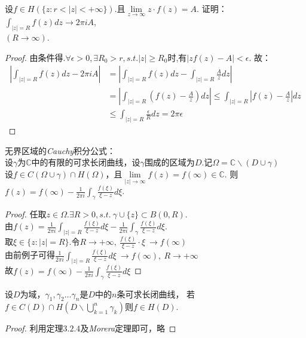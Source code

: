 \begin{eg}
	设$f\in H(\{z:r<|z|<+\infty\})$.且$\lim\limits_{z\rightarrow\infty}z\cdot f(z)=A$.
	证明：$\displaystyle{\int_{|z|=R}f(z)dz\rightarrow 2\pi iA}$,\\$(R\rightarrow\infty)$.
\end{eg}
\begin{proof}
	由条件得.$\forall\epsilon>0,\exists R_0>r,s.t.|z|\geq R_0$时,有$|zf(z)-A|<\epsilon$.
	故：
	\begin{align*}
	\left|\int_{|z|=R}f(z)dz-2\pi iA\right|
	&=\left|\int_{|z|=R}f(z)dz-\int_{|z|=R}\frac{A}{z}dz\right|\\
	&=\left|\int_{|z|=R}(f(z)-\frac{A}{z})dz\right|\leq\int_{|z|=R}\left|f(z)-\frac{A}{z}\right|dz\\
	&\leq\int_{|z|=R}\frac{\epsilon}{R}dz=2\pi\epsilon
	\end{align*}
\end{proof}
\begin{eg}
	无界区域的\emph{Cauchy}积分公式：\\
	设$\gamma$为$\mathbb{C}$中的有限的可求长闭曲线，设$\gamma$围成的区域为$D$.记$\Omega=\mathbb{C}\backslash(D\cup \gamma)$\\
	设$f\in C(\Omega\cup \gamma)\cap H(\Omega)$，且$\lim\limits_{|z|\rightarrow\infty}f(z)=f(\infty)\in\mathbb{C}$.
	则$\displaystyle{f(z)=f(\infty)-\frac{1}{2\pi i}\int_{\gamma}\frac{f(\xi)}{\xi-z}d\xi}$.
\end{eg}
\begin{proof}
	任取$\displaystyle{z\in\Omega.\exists R>0,s.t.\ \gamma\cup\{z\}\subset B(0,R)}$.\\
	由$\displaystyle{f(z)=\frac{1}{2\pi i}\int_{|z|=R}\frac{f(\xi)}{\xi-z}d\xi-\frac{1}{2\pi i}\int_{\gamma}\frac{f(\xi)}{\xi-z}d\xi}$.\\
	取$\displaystyle{\xi\in\{z:|z|=R\}}$.令$\displaystyle{R\rightarrow+\infty,\ \frac{f(\xi)}{\xi-z}\cdot\xi\ \rightarrow f(\infty)}$\\
	由前例子可得$\displaystyle{\frac{1}{2\pi i}\int_{|z|=R}\frac{f(\xi)}{\xi-z}d\xi\ \rightarrow f(\infty),\ R\rightarrow+\infty}$\\
	故$\displaystyle{f(z)=f(\infty)-\frac{1}{2\pi i}\int_\gamma\frac{f(\xi)}{\xi-z}d\xi}$
\end{proof}

\begin{eg}
	设$D$为域，$\gamma_1,\gamma_2\dots \gamma_n$是$D$中的$n$条可求长闭曲线，
	若$\displaystyle{f\in C(D)\cap H(D\backslash \mathop{\bigcup}\limits_{k=1}^{n}\gamma_k)}$则$f\in H(D)$.
\end{eg}
\begin{proof}
	利用定理$3.2.4$及\emph{Morera}定理即可，略
\end{proof}

